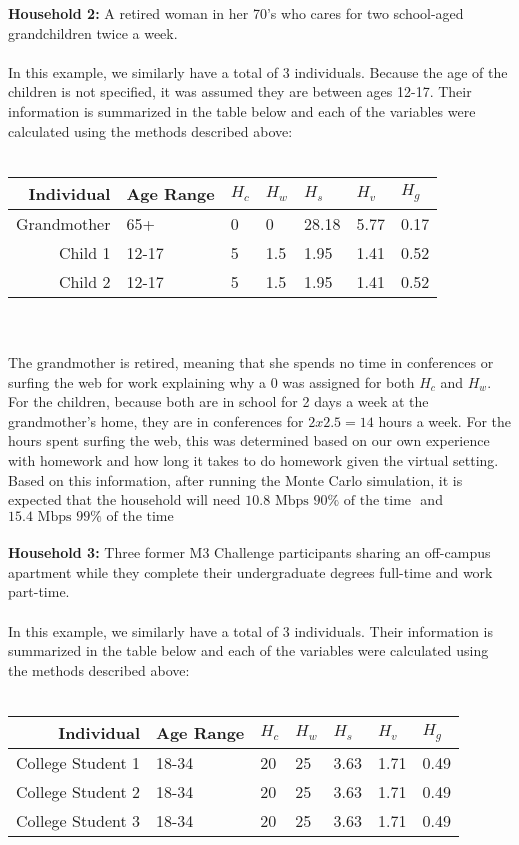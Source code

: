 \documentclass[12pt]{article}
\begin{document}
\textbf{Household 2:} A retired woman in her 70’s who cares for two school-aged grandchildren twice a week.
\\
\\
In this example, we similarly have a total of 3 individuals. Because the age of the children is not specified, it was assumed they are between ages 12-17. Their information is summarized in the table below and each of the variables were calculated using the methods described above:
\\
\\
\begin{tabular}{|r|p{1in}|p{0.57in}|p{0.57in}|p{0.57in}|p{0.57in}|p{0.57in}|}
\hline
\textbf{Individual} &Age Range& \textbf{$H_c$} & \textbf{$H_w$} & \textbf{$H_s$} & \textbf{$H_v$} & \textbf{$H_g$}
\\
\hline
Grandmother & 65+ & 0 & 0 & 28.18 & 5.77 & 0.17 
\\
\hline
Child 1 & 12-17 & 5 & 1.5 & 1.95 & 1.41 & 0.52
\\
\hline
Child 2 & 12-17 & 5 & 1.5 & 1.95 & 1.41 & 0.52
\\
\hline
\end{tabular}
\\
\\
The grandmother is retired, meaning that she spends no time in conferences or surfing the web for work explaining why a 0 was assigned for both $H_c$ and $H_w$. For the children, because both are in school for 2 days a week at the grandmother's home, they are in conferences for $2x2.5=14$ hours a week. For the hours spent surfing the web, this was determined based on our own experience with homework and how long it takes to do homework given the virtual setting. Based on this information, after running the Monte Carlo simulation, it is expected that the household will need $\boxed{10.8 \text{ Mbps } 90\% \text{ of the time }}$ and $\boxed{15.4 \text{ Mbps } 99\% \text{ of the time }}$
\\
\\
\textbf{Household 3:} Three former M3 Challenge participants sharing an off-campus apartment while they complete their undergraduate degrees full-time and work part-time. 
\\
\\
In this example, we similarly have a total of 3 individuals. Their information is summarized in the table below and each of the variables were calculated using the methods described above:
\\
\\
\begin{tabular}{|r|p{1in}|p{0.57in}|p{0.57in}|p{0.57in}|p{0.57in}|p{0.57in}|}
\hline
\textbf{Individual} &Age Range& \textbf{$H_c$} & \textbf{$H_w$} & \textbf{$H_s$} & \textbf{$H_v$} & \textbf{$H_g$}
\\
\hline
College Student 1 & 18-34 & 20 & 25 & 3.63 & 1.71 & 0.49
\\
\hline
College Student 2 & 18-34 & 20 & 25 & 3.63 & 1.71 & 0.49
\\
\hline
College Student 3 & 18-34 & 20 & 25 & 3.63 & 1.71 & 0.49
\\
\hline
\end{tabular}
\end{document}
